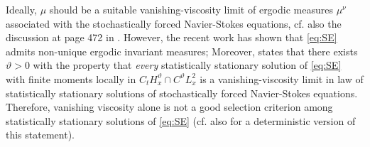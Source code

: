 \documentclass[10pt,a4paper]{amsart}
\numberwithin{equation}{section}
\numberwithin{corollario}{section}
\numberwithin{lemma}{section}
\numberwithin{prop}{section}
\theoremstyle{definition}
\theoremstyle{remark}
\begin{document}
Ideally, $\mu$ should be a suitable vanishing-viscosity limit of ergodic measures $\mu^\nu$ associated with the stochastically forced Navier-Stokes equations, cf. also the discussion at page 472 in \cite{Ku04}.
However, the recent work \cite{HoZhZh25} has shown that \eqref{eq:SE} admits non-unique ergodic invariant measures; Moreover, \cite[Theorem 1.5]{HoZhZh25} states that there exists $\vartheta>0$ with the property that \emph{every} statistically stationary solution of \eqref{eq:SE} with finite moments locally in $C_t H^\vartheta_x \cap C^\vartheta L^2_x$ is a vanishing-viscosity limit in law of statistically stationary solutions of stochastically forced Navier-Stokes equations. Therefore, vanishing viscosity alone is not a good selection criterion among statistically stationary solutions of \eqref{eq:SE} (cf. also \cite[Theorem 1.3]{BuVi19} for a deterministic version of this statement).
\end{document}
